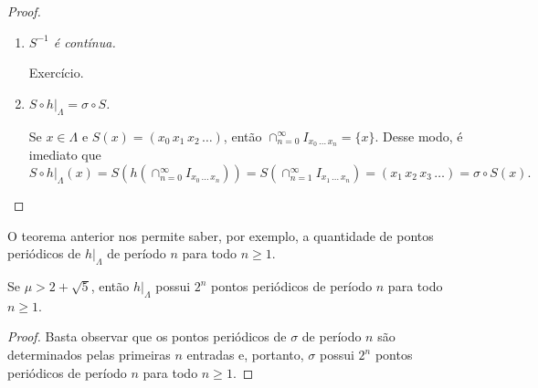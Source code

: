 \begin{proof}
\begin{enumerate}[label=\alph*)]
\item \textit{$S^{-1}$ é contínua.}

Exercício.

\item \textit{$S \circ h|_\Lambda = \sigma \circ S$.}

Se $x \in \Lambda$ e $S(x) = (x_0 \, x_1 \, x_2 \, \dots)$, então $\cap_{n=0}^\infty I_{x_0 \, \dots \, x_n} = \lbrace x \rbrace$. Desse modo, é imediato que
$$ S \circ h|_{\Lambda}(x) = S(h(\cap_{n=0}^\infty I_{x_0 \, \dots \, x_n})) = S(\cap_{n=1}^\infty I_{x_1 \, \dots \, x_n}) = (x_1 \, x_2 \, x_3 \, \dots)  = \sigma \circ S(x).$$
\end{enumerate}
\end{proof}

O teorema anterior nos permite saber, por exemplo, a quantidade de pontos periódicos de $h|_\Lambda$ de período $n$ para todo $n \geq 1$.

\begin{corollary}
Se $\mu > 2 + \sqrt{5}$, então $h|_\Lambda$ possui $2^n$ pontos periódicos de período $n$ para todo $n \geq 1$.
\end{corollary}

\begin{proof}
Basta observar que os pontos periódicos de $\sigma$ de período $n$ são determinados pelas primeiras $n$ entradas e, portanto, $\sigma$ possui $2^n$ pontos periódicos de período $n$ para todo $n \geq 1$.
\end{proof}

